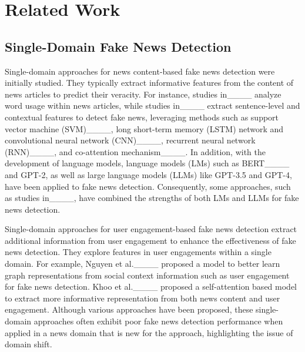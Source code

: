 \section{Related Work}
\subsection{Single-Domain Fake News Detection}
Single-domain approaches for news content-based fake news detection were initially studied. They typically extract informative features from the content of news articles to predict their veracity. For instance, studies in____ analyze word usage within news articles, while studies in____ extract sentence-level and contextual features to detect fake news, leveraging methods such as support vector machine (SVM)____, long short-term memory (LSTM) network and convolutional neural network (CNN)____, recurrent neural network (RNN)____, and co-attention mechanism____. In addition, with the development of language models, language models (LMs) such as BERT____ and GPT-2, as well as large language models (LLMs) like GPT-3.5 and GPT-4, have been applied to fake news detection. Consequently, some approaches, such as studies in____, have combined the strengths of both LMs and LLMs for fake news detection. 

Single-domain approaches for user engagement-based fake news detection extract additional information from user engagement to enhance the effectiveness of fake news detection. They explore features in user engagements within a single domain. For example, Nguyen et al.____ proposed a model to better learn graph representations from social context information such as user engagement for fake news detection. Khoo et al.____ proposed a self-attention based model to extract more informative representation from both news content and user engagement. Although various approaches have been proposed, these single-domain approaches often exhibit poor fake news detection performance when applied in a news domain that is new for the approach, highlighting the issue of domain shift.

